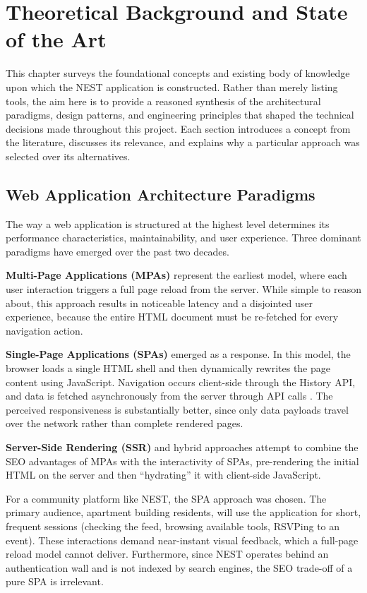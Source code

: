 \chapter{Theoretical Background and State of the Art}
\label{chap:theoretical-background}

This chapter surveys the foundational concepts and existing body of knowledge upon which the NEST application is constructed. Rather than merely listing tools, the aim here is to provide a reasoned synthesis of the architectural paradigms, design patterns, and engineering principles that shaped the technical decisions made throughout this project. Each section introduces a concept from the literature, discusses its relevance, and explains why a particular approach was selected over its alternatives.

\section{Web Application Architecture Paradigms}

The way a web application is structured at the highest level determines its performance characteristics, maintainability, and user experience. Three dominant paradigms have emerged over the past two decades.

\textbf{Multi-Page Applications (MPAs)} represent the earliest model, where each user interaction triggers a full page reload from the server. While simple to reason about, this approach results in noticeable latency and a disjointed user experience, because the entire HTML document must be re-fetched for every navigation action.

\textbf{Single-Page Applications (SPAs)} emerged as a response. In this model, the browser loads a single HTML shell and then dynamically rewrites the page content using JavaScript. Navigation occurs client-side through the History API, and data is fetched asynchronously from the server through API calls \cite{angularDocs}. The perceived responsiveness is substantially better, since only data payloads travel over the network rather than complete rendered pages.

\textbf{Server-Side Rendering (SSR)} and hybrid approaches attempt to combine the SEO advantages of MPAs with the interactivity of SPAs, pre-rendering the initial HTML on the server and then ``hydrating'' it with client-side JavaScript.

For a community platform like NEST, the SPA approach was chosen. The primary audience, apartment building residents, will use the application for short, frequent sessions (checking the feed, browsing available tools, RSVPing to an event). These interactions demand near-instant visual feedback, which a full-page reload model cannot deliver. Furthermore, since NEST operates behind an authentication wall and is not indexed by search engines, the SEO trade-off of a pure SPA is irrelevant.

